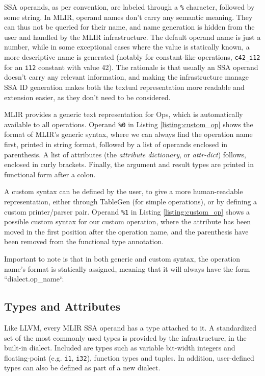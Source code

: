 SSA operands, as per convention, are labeled through a \texttt{\%} character, followed by some string. In MLIR, operand names don’t carry any semantic meaning. They can thus not be queried for their name, and name generation is hidden from the user and handled by the MLIR infrastructure. The default operand name is just a number, while in some exceptional cases where the value is statically known, a more descriptive name is generated (notably for constant-like operations, \eg \texttt{c42\_i12} for an \texttt{i12} constant with value 42). The rationale is that usually an SSA operand doesn't carry any relevant information, and making the infrastructure manage SSA ID generation makes both the textual representation more readable and extension easier, as they don't need to be considered.

MLIR provides a generic text representation for Ops, which is automatically available to all operations. Operand \texttt{\%0} in Listing \ref{listing:custom_op} shows the format of MLIR's generic syntax, where we can always find the operation name first, printed in string format, followed by a list of operands enclosed in parenthesis. A list of attributes (the \textit{attribute dictionary}, or \textit{attr-dict}) follows, enclosed in curly brackets. Finally, the argument and result types are printed in functional form after a colon.

A custom syntax can be defined by the user, to give a more human-readable representation, either through TableGen (for simple operations), or by defining a custom printer/parser pair. Operand \texttt{\%1} in Listing \ref{listing:custom_op} shows a possible custom syntax for our custom operation, where the attribute has been moved in the first position after the operation name, and the parenthesis have been removed from the functional type annotation.

Important to note is that in both generic and custom syntax, the operation name's format is statically assigned, meaning that it will always have the form “dialect.op\_name“.


\subsection{Types and Attributes}
Like LLVM, every MLIR SSA operand has a type attached to it. A standardized set of the most commonly used types is provided by the infrastructure, in the built-in dialect. Included are types such as variable bit-width integers and floating-point (e.g. \texttt{i1}, \texttt{i32}), function types and tuples. In addition, user-defined types can also be defined as part of a new dialect.

